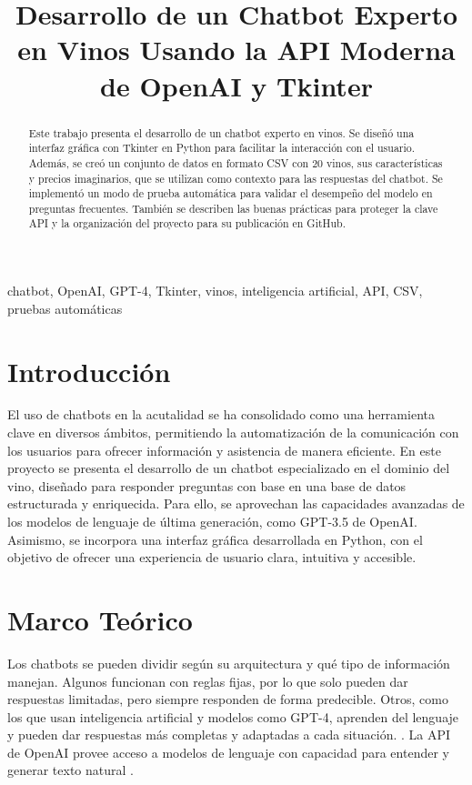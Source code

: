 \documentclass[conference]{IEEEtran}
\title{Desarrollo de un Chatbot Experto en Vinos Usando la API Moderna de OpenAI y Tkinter}
\author{\IEEEauthorblockN{Roberto Alvarado}
\IEEEauthorblockA{UTPL
Email: raalvarado6@utpl.edu.ec}}
\begin{document}
\maketitle

\begin{abstract}
Este trabajo presenta el desarrollo de un chatbot experto en vinos. Se diseñó
una interfaz gráfica con Tkinter en Python para facilitar la interacción con el
usuario. Además, se creó un conjunto de datos en formato CSV con 20 vinos, sus
características y precios imaginarios, que se utilizan como contexto para las
respuestas del chatbot. Se implementó un modo de prueba automática para validar
el desempeño del modelo en preguntas frecuentes. También se describen las
buenas prácticas para proteger la clave API y la organización del proyecto para
su publicación en GitHub.
\end{abstract}

\begin{IEEEkeywords}
chatbot, OpenAI, GPT-4, Tkinter, vinos, inteligencia artificial, API, CSV,
pruebas automáticas
\end{IEEEkeywords}

\section{Introducción}
El uso de chatbots en la acutalidad se ha consolidado como una herramienta clave en diversos
ámbitos, permitiendo la automatización de la comunicación con los usuarios para
ofrecer información y asistencia de manera eficiente. En este proyecto se
presenta el desarrollo de un chatbot especializado en el dominio del vino,
diseñado para responder preguntas con base en una base de datos estructurada y
enriquecida. Para ello, se aprovechan las capacidades avanzadas de los modelos
de lenguaje de última generación, como GPT-3.5 de OpenAI. Asimismo, se incorpora
una interfaz gráfica desarrollada en Python, con el objetivo de ofrecer una
experiencia de usuario clara, intuitiva y accesible.

\section{Marco Teórico}
Los chatbots se pueden dividir según su arquitectura y qué tipo de
información manejan. Algunos funcionan con reglas fijas, por lo que solo pueden
dar respuestas limitadas, pero siempre responden de forma predecible. Otros,
como los que usan inteligencia artificial y modelos como GPT-4, aprenden del
lenguaje y pueden dar respuestas más completas y adaptadas a cada situación.
\cite{shawar2007chatbots,adamopoulou2020overview}. La API de OpenAI provee
acceso a modelos de lenguaje con capacidad para entender y generar
texto natural \cite{brown2020language}.
\end{document}
